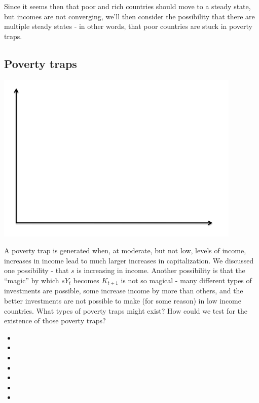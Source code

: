 \documentclass[12pt,english]{article}
\begin{document}
Since it seems then that poor and rich countries should move to a steady state, but incomes are not converging, we'll then consider the possibility that there are multiple steady states - in other words, that poor countries are stuck in poverty traps.

\subsection{Poverty traps}

\begin{center}
	\begin{adjustbox}{
			max width=0.8\textwidth,
		}
		\includegraphics{axes.png}
	\end{adjustbox}
\end{center}
A poverty trap is generated when, at moderate, but not low, levels of income, increases in income lead to much larger increases in capitalization. We discussed one possibility - that $s$ is increasing in income. Another possibility is that the ``magic'' by which $sY_{t}$ becomes $K_{t+1}$ is not so magical - many different types of investments are possible, some increase income by more than others, and the better investments are not possible to make (for some reason) in low income countries. What types of poverty traps might exist? How could we test for the existence of those poverty traps?
\begin{itemize}
	\item 
	\item
	\item
	\item
	\item
	\item
	\item
\end{itemize}
\end{document}
